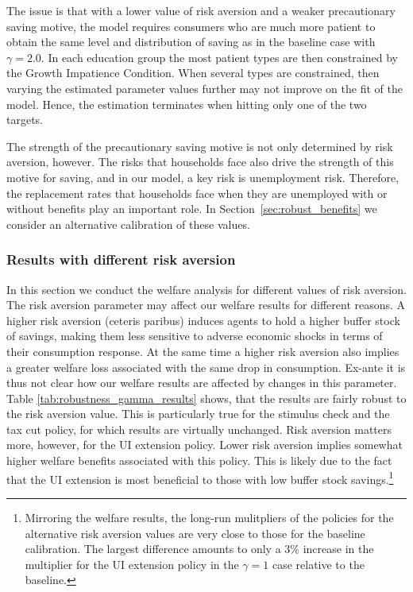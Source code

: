 \documentclass[../HAFiscal]{subfiles}
\begin{document}
The issue is that with a lower value of risk aversion and a weaker precautionary saving motive, the model requires consumers who are much more patient to obtain the same level and distribution of saving as in the baseline case with $\gamma=2.0$. In each education group the most patient types are then constrained by the Growth Impatience Condition. When several types are constrained, then varying the estimated parameter values further may not improve on the fit of the model. Hence, the estimation terminates when hitting only one of the two targets. 

The strength of the precautionary saving motive is not only determined by risk aversion, however. The risks that households face also drive the strength of this motive for saving, and in our model, a key risk is unemployment risk. Therefore, the replacement rates that households face when they are unemployed with or without benefits play an important role. In Section~\ref{sec:robust_benefits} we consider an alternative calibration of these values. 

\subsubsection{Results with different risk aversion}
\label{sec:robust_gamma_results}

In this section we conduct the welfare analysis for different values of risk aversion. The risk aversion parameter may affect our welfare results for different reasons. A higher risk aversion (ceteris paribus) induces agents to hold a higher buffer stock of savings, making them less sensitive to adverse economic shocks in terms of their consumption response. At the same time a higher risk aversion also implies a greater welfare loss associated with the same drop in consumption. Ex-ante it is thus not clear how our welfare results are affected by changes in this parameter. Table \ref{tab:robustness_gamma_results} shows, that the results are fairly robust to the risk aversion value. This is particularly true for the stimulus check and the tax cut policy, for which results are virtually unchanged. Risk aversion matters more, however, for the UI extension policy. Lower risk aversion implies somewhat higher welfare benefits associated with this policy. This is likely due to the fact that the UI extension is most beneficial to those with low buffer stock savings.\footnote{Mirroring the welfare results, the long-run mulitpliers of the policies  for the alternative risk aversion values are very close to those for the baseline calibration. The largest difference amounts to only a 3\% increase in the multiplier for the UI extension policy in the $\gamma = 1$ case relative to the baseline.}
\end{document}
